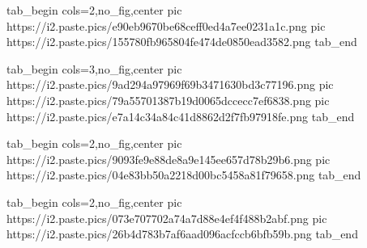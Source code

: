  
 
 
 
 
\qqSecCmtScr

\ifcmt
  tab_begin cols=2,no_fig,center
     pic https://i2.paste.pics/e90eb9670be68ceff0ed4a7ee0231a1c.png
		 pic https://i2.paste.pics/155780fb965804fe474de0850ead3582.png
  tab_end
\fi

\ifcmt
  tab_begin cols=3,no_fig,center
		pic https://i2.paste.pics/9ad294a97969f69b3471630bd3c77196.png
		pic https://i2.paste.pics/79a55701387b19d0065dccecc7ef6838.png
		pic https://i2.paste.pics/e7a14c34a84c41d8862d2f7fb97918fe.png
  tab_end
\fi

\ifcmt
  tab_begin cols=2,no_fig,center
		pic https://i2.paste.pics/9093fe9e88de8a9e145ee657d78b29b6.png
		pic https://i2.paste.pics/04e83bb50a2218d00bc5458a81f79658.png
  tab_end
\fi

\ifcmt
  tab_begin cols=2,no_fig,center
		pic https://i2.paste.pics/073e707702a74a7d88e4ef4f488b2abf.png
		pic https://i2.paste.pics/26b4d783b7af6aad096acfccb6bfb59b.png
  tab_end
\fi
